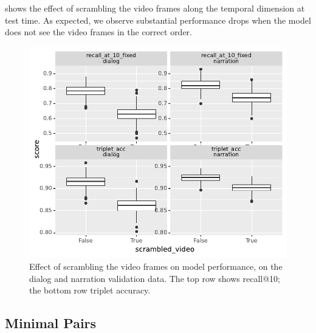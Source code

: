  shows the effect of scrambling the video frames 
along the temporal dimension at test time. As expected, we observe substantial 
performance drops when the model does not see the video frames in 
the correct order.
\begin{figure}[htb]
	\centering
	\includegraphics[width=\columnwidth]{results/ablations/scrambled_video.pdf}
	\caption{Effect of scrambling the video frames on model performance, on the 
	dialog and narration validation data. The top row shows recall@10;
		the bottom row triplet accuracy.}
	\label{fig:scrambled_video}
\end{figure}

\subsection{Minimal Pairs}
\label{sec:minimal-pairs}


